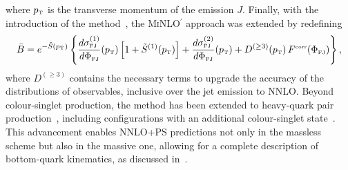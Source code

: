 \documentclass[11pt,a4paper]{article}
\begin{document}
where $p_{\scriptscriptstyle\rm T}$ is the transverse momentum of the
emission $J$. Finally, with the introduction of the \minnlo{}
method~\cite{Monni:2019whf,Monni:2020nks}, the {\small
  \textsc{MiNLO$^\prime$}} approach was extended by redefining
\begin{equation}
  \label{MiNNLOPS_cross_section}
  \bar{B} = e^{-\tilde{S}\left(p_{\scriptscriptstyle\rm T}\right)}
  \left\{\frac{d\sigma_{\scriptscriptstyle\rm
      FJ}^{(1)}}{d\Phi_{\scriptscriptstyle\rm
      FJ}}\!\left(p_{\scriptscriptstyle\rm T}\right) \left[1 +
    \tilde{S}^{(1)}\!\left(p_{\scriptscriptstyle\rm T}\right)\right] +
  \frac{d\sigma_{\scriptscriptstyle\rm
      FJ}^{(2)}}{d\Phi_{\scriptscriptstyle\rm
      FJ}}\!\left(p_{\scriptscriptstyle\rm T}\right) + D^{(\geq
    3)}\!\left(p_{\scriptscriptstyle\rm T}\right)
  F^{\scriptscriptstyle\rm corr}\!\left(\Phi_{\scriptscriptstyle\rm
    FJ}\right)\right\},
\end{equation}
where $D^{(\geq 3)}$ contains the necessary terms to upgrade the
accuracy of the distributions of observables, inclusive over the jet
emission to NNLO. Beyond colour-singlet production, the \minnlo{} method has been extended to heavy-quark pair production~\cite{mazzitelli:2020jio,mazzitelli:2021mmm}, including configurations with an additional colour-singlet state~\cite{mazzitelli:2024ura}. This advancement enables NNLO+PS predictions not only in the massless scheme but also in the massive one, allowing for a complete description of bottom-quark kinematics, as discussed in~.
\end{document}
